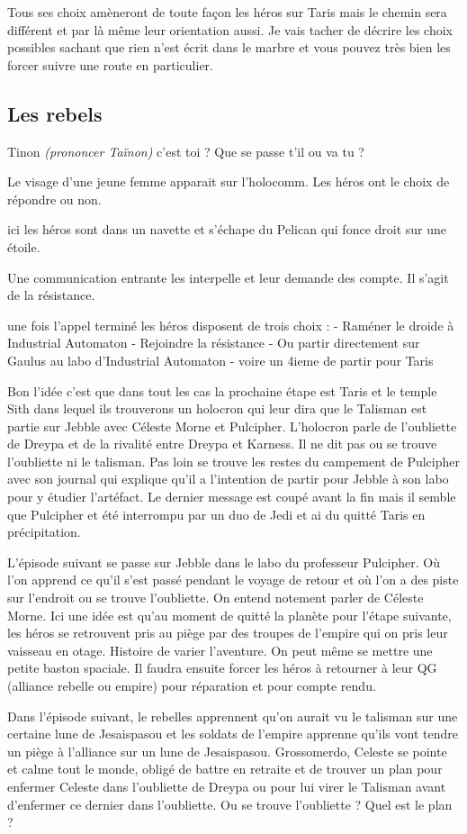 Tous ses choix amèneront de toute façon les héros sur Taris mais le chemin sera différent et par là même leur orientation aussi. Je vais tacher de décrire les choix possibles sachant que rien n’est écrit dans le marbre et vous pouvez très bien les forcer suivre une route en particulier.


\subsection{Les rebels}
\begin{quotebox}
    Tinon \emph{(prononcer Taïnon)} c’est toi ? Que se passe t’il ou va tu ?
\end{quotebox}

Le visage d’une jeune femme apparait sur l’holocomm. Les héros ont le choix de répondre ou non.

ici les héros sont dans un navette et s’échape du Pelican qui fonce droit sur une étoile.

Une communication entrante les interpelle et leur demande des compte. Il s’agit de la résistance.

une fois l'appel terminé les héros disposent de trois choix :
 - Raméner le droide à Industrial Automaton
 - Rejoindre la résistance
 - Ou partir directement sur Gaulus au labo d'Industrial Automaton
 - voire un 4ieme de partir pour Taris

Bon l'idée c'est que dans tout les cas la prochaine étape est Taris et le temple Sith dans lequel ils trouverons un holocron qui leur dira que le Talisman est partie sur Jebble avec Céleste Morne et Pulcipher.
L'holocron parle de l'oubliette de Dreypa et de la rivalité entre Dreypa et Karness. Il ne dit pas ou se trouve l'oubliette ni le talisman. 
Pas loin se trouve les restes du campement de Pulcipher avec son journal qui explique qu'il a l'intention de partir pour Jebble à son labo pour y étudier l'artéfact. Le dernier message est coupé avant la fin mais il semble que Pulcipher et été interrompu par un duo de Jedi et ai du quitté Taris en précipitation.


L'épisode suivant se passe sur Jebble dans le labo du professeur Pulcipher. Où l'on apprend ce qu'il s'est passé pendant le voyage de retour et où l'on a des piste sur l'endroit ou se trouve l'oubliette. On entend notement parler de Céleste Morne.
Ici une idée est qu'au moment de quitté la planète pour l'étape suivante, les héros se retrouvent pris au piège par des troupes de l'empire qui on pris leur vaisseau en otage. Histoire de varier l'aventure. On peut même se mettre une petite baston spaciale.
Il faudra ensuite forcer les héros à retourner à leur QG (alliance rebelle ou empire) pour réparation et pour compte rendu.

Dans l'épisode suivant, le rebelles apprennent qu'on aurait vu le talisman sur une certaine lune de Jesaispasou et les soldats de l'empire apprenne qu'ils vont tendre un piège à l'alliance sur un lune de Jesaispasou.
Grossomerdo, Celeste se pointe et calme tout le monde, obligé de battre en retraite et de trouver un plan pour enfermer Celeste dans l'oubliette de Dreypa ou pour lui virer le Talisman avant d'enfermer ce dernier dans l'oubliette. Ou se trouve l'oubliette ? Quel est le plan ?